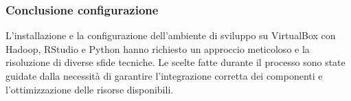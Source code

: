 \subsubsection{Conclusione configurazione}
L'installazione e la configurazione dell'ambiente di sviluppo su VirtualBox con Hadoop, RStudio e Python hanno richiesto un approccio meticoloso e la risoluzione di diverse sfide tecniche. Le scelte fatte durante il processo sono state guidate dalla necessità di garantire l'integrazione corretta dei componenti e l'ottimizzazione delle risorse disponibili.



